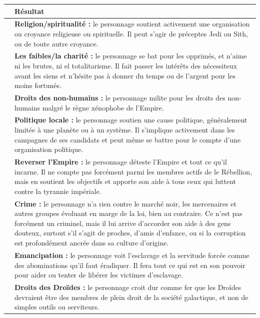 \documentclass[twoside]{article}
\begin{document}
\begin{table}[h]
	\centering
	\begin{tabular}{|m{2cm}|m{13cm}|}
		\hline
		\centering{\cellcolor{DarkRed} {\large \textcolor{PureWhite}{\textbf{D100}}}} & \cellcolor{DarkRed} {\large \textcolor{PureWhite}{\textbf{Résultat}}} \\
		\hline
		\centering{01 -- 10} & \textbf{Religion/spiritualité :} le personnage soutient activement une organisation ou croyance religieuse ou spirituelle. Il peut s'agir de préceptes Jedi ou Sith, ou de toute autre croyance. \\
		\hline
		\centering{11 -- 20} & \textbf{Les faibles/la charité :} le personnage se bat pour les opprimés, et n'aime ni les brutes, ni el totalitarisme. Il fait passer les intérêts des nécessiteux avant les siens et n'hésite pas à donner du temps ou de l'argent pour les moins fortunés. \\
		\hline
		\centering{21 -- 30} & \textbf{Droits des non-humains :} le personnage milite pour les droits des non-humains malgré le règne xénophobe de l'Empire. \\
		\hline
		\centering{31 -- 40} & \textbf{Politique locale :} le personnage soutien une cause politique, généralement limitée à une planète ou à un système. Il s'implique activement dans les campagnes de ses candidats et peut même se battre pour le compte d'une organisation politique. \\
		\hline
		\centering{41 -- 50} & \textbf{Reverser l'Empire :} le personnage déteste l'Empire et tout ce qu'il incarne. Il ne compte pas forcément parmi les membres actifs de le Rébellion, mais en soutient les objectifs et apporte son aide à tous ceux qui luttent contre la tyrannie impériale. \\
		\hline
		\centering{51 -- 60} & \textbf{Crime :} le personnage n'a rien contre le marché noir, les mercenaires et autres groupes évoluant en marge de la loi, bien au contraire. Ce n'est pas forcément un criminel, mais il lui arrive d'accorder son aide à des gens douteux, surtout s'il s'agit de proches, d'amis d'enfance, ou si la corruption est profondément ancrée dans sa culture d'origine. \\
		\hline
		\centering{61 -- 70} & \textbf{Emancipation :} le personnage voit l'esclavage et la servitude forcée comme des abominations qu'il faut éradiquer. Il fera tout ce qui est en son pouvoir pour aider ou tenter de libérer les victimes d'esclavage. \\
		\hline
		\centering{71 -- 80} & \textbf{Droits des Droïdes :} le personnage croit dur comme fer que les Droïdes devraient être des membres de plein droit de la société galactique, et non de simples outils ou serviteurs. \\

\end{tabular}
\end{table}
\end{document}
